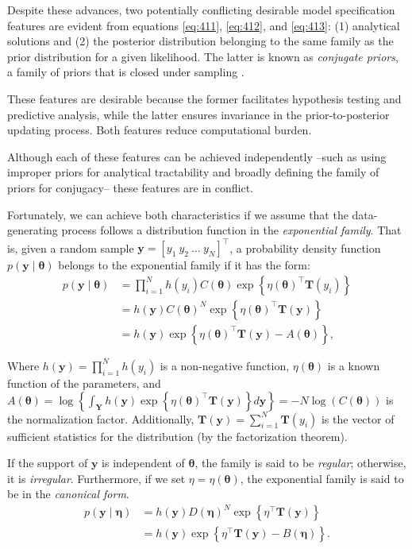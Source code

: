 Despite these advances, two potentially conflicting desirable model specification features are evident from equations \ref{eq:411}, \ref{eq:412}, and \ref{eq:413}: (1) analytical solutions and (2) the posterior distribution belonging to the same family as the prior distribution for a given likelihood. The latter is known as \textit{conjugate priors}, a family of priors that is closed under sampling \cite{schlaifer1961applied}.

These features are desirable because the former facilitates hypothesis testing and predictive analysis, while the latter ensures invariance in the prior-to-posterior updating process. Both features reduce computational burden.

Although each of these features can be achieved independently --such as using improper priors for analytical tractability and broadly defining the family of priors for conjugacy-- these features are in conflict.

Fortunately, we can achieve both characteristics if we assume that the data-generating process follows a distribution function in the \textit{exponential family}. That is, given a random sample $\bm{y}=[y_1 \ y_2 \ \dots \ y_N]^{\top}$, a probability density function $p(\bm{y}\mid \bm{\theta})$ belongs to the exponential family if it has the form:
\begin{align}
	p(\bm{y}\mid \bm{\theta})&=\prod_{i=1}^N h(y_i) C(\bm{\theta}) \exp\left\{\eta(\bm{\theta})^{\top}\bm{T}(y_i)\right\}\label{eq:414}\\ 
	&=h(\bm{y}) C(\bm{\theta})^N\exp\left\{\eta(\bm{\theta})^{\top}\bm{T}(\bm{y})\right\}\nonumber \\
	&=h(\bm{y})\exp\left\{\eta(\bm{\theta})^{\top}\bm{T}(\bm{y})-A(\bm{\theta})\right\}\nonumber,
\end{align}

Where \( h(\bm{y}) = \prod_{i=1}^N h(y_i) \) is a non-negative function, \( \eta(\bm{\theta}) \) is a known function of the parameters, and \( A(\bm{\theta}) = \log\left\{ \int_{\bm{Y}} h(\bm{y}) \exp\left\{ \eta(\bm{\theta})^{\top} \bm{T}(\bm{y}) \right\} d\bm{y} \right\} = -N \log\left(C(\bm{\theta})\right) \) is the normalization factor. Additionally, \( \bm{T}(\bm{y}) = \sum_{i=1}^N \bm{T}(y_i) \) is the vector of sufficient statistics for the distribution (by the factorization theorem).

If the support of \( \bm{y} \) is independent of \( \bm{\theta} \), the family is said to be \textit{regular}; otherwise, it is \textit{irregular}. Furthermore, if we set \( \eta = \eta(\bm{\theta}) \), the exponential family is said to be in the \textit{canonical form}.
\begin{align}
	p(\bm{y}\mid \bm{\eta})&=h(\bm{y})D(\bm{\eta})^N\exp\left\{\eta^{\top}\bm{T}(\bm{y})\right\}\nonumber\\
	&=h(\bm{y})\exp\left\{\eta^{\top}\bm{T}(\bm{y})-B(\bm{\eta})\right\}.\nonumber
\end{align}

